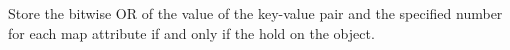 Store the bitwise OR of the value of the key-value pair and the specified number
for each map attribute if and only if the  hold on the object.




